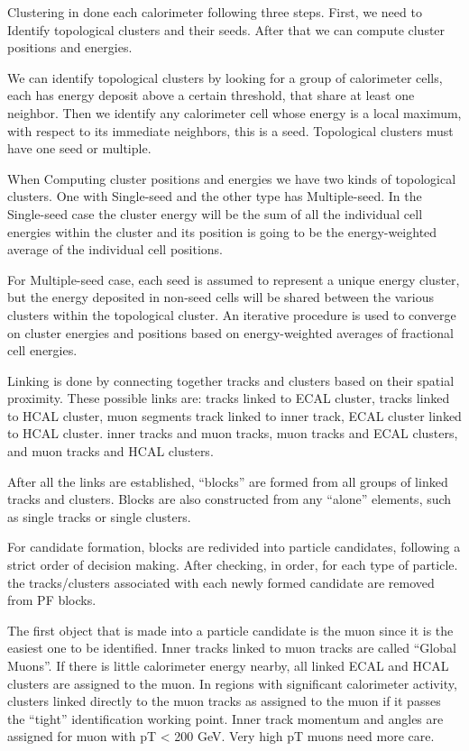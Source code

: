 Clustering in done each calorimeter following three steps. First, we need to Identify topological clusters and their seeds. After that we can compute cluster positions and energies.

We can identify topological clusters by looking for a group of calorimeter cells, each has energy deposit above a certain threshold, that share at least one neighbor. Then we identify any calorimeter cell whose energy is a local maximum, with respect to its immediate neighbors, this is a seed. Topological clusters must have one seed or multiple.

When Computing cluster positions and energies we have two kinds of topological clusters. One with Single-seed and the other type has Multiple-seed. In the Single-seed case the cluster energy will be the sum of all the individual cell energies within the cluster and its position is going to be the energy-weighted average of the individual cell positions.

For Multiple-seed case, each seed is assumed to represent a unique energy cluster, but the energy deposited in non-seed cells will be shared between the various clusters within the topological cluster.  An iterative procedure is used to converge on cluster energies and positions based on energy-weighted averages of fractional cell energies.

Linking is done by connecting together tracks and clusters based on their spatial proximity. These possible links are: tracks linked to ECAL cluster, tracks linked to HCAL cluster, muon segments track linked to inner track, ECAL cluster linked to HCAL cluster. inner tracks and muon tracks, muon tracks and ECAL clusters, and muon tracks and HCAL clusters.

After all the links are established, “blocks” are formed from all groups of linked tracks and clusters. Blocks are also constructed from any “alone” elements, such as single tracks or single clusters.

For candidate formation, blocks are redivided into particle candidates, following a strict order of decision making. After checking, in order, for each type of particle. the tracks/clusters associated with each newly formed candidate are removed from PF blocks.


The first object that is made into a particle candidate is the muon since it is the easiest one to be identified. Inner tracks linked to muon tracks are called “Global Muons”. If there is little calorimeter energy nearby, all linked ECAL and HCAL clusters are assigned to the muon. In regions with significant calorimeter activity, clusters linked directly to the muon tracks as assigned to the muon if it passes the “tight” identification working point. Inner track momentum and angles are assigned for muon with pT < 200 GeV. Very high pT muons need more care.


